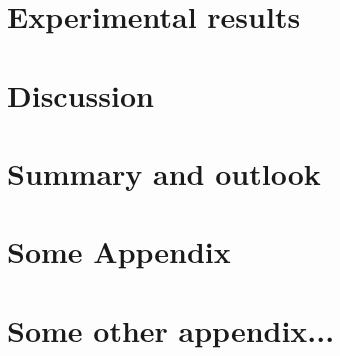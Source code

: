\documentclass[twoside,english]{uiofysmaster/uiofysmaster}
\begin{document}
\chapter{Experimental results}




\chapter{Discussion}



\chapter{Summary and outlook}







\begin{appendices}
\chapter{Some Appendix}


\chapter{Some other appendix...}

\end{appendices}



%


\end{document}
